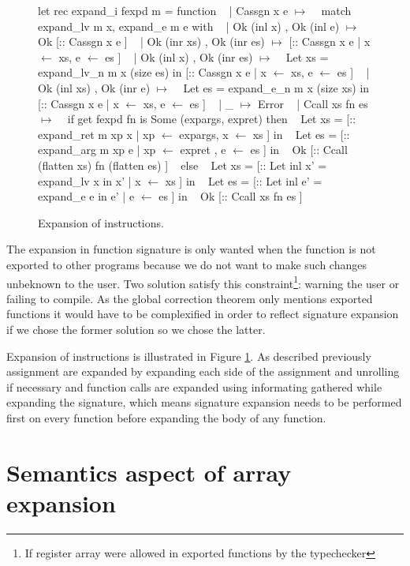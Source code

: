 \documentclass{article}
\begin{document}
\begin{figure}[t]
\obeylines\obeyspaces\ttfamily%
let rec expand\_i fexpd m = function
~ | Cassgn x e \(\mapsto\)
~   match expand\_lv m x, expand\_e m e    with
~   | Ok (inl x)       , Ok (inl e)      \(\mapsto\) Ok [:: Cassgn x e ]
~   | Ok (inr xs)      , Ok (inr es)     \(\mapsto\) [:: Cassgn x e | x \(\gets\) xs, e \(\gets\) es ]
~   | Ok (inl x)       , Ok (inr es)     \(\mapsto\)
~     Let xs = expand\_lv\_n m x (size es) in [:: Cassgn x e | x \(\gets\) xs, e \(\gets\) es ]
~   | Ok (inl xs)      , Ok (inr e)      \(\mapsto\)
~     Let es = expand\_e\_n  m x (size xs) in [:: Cassgn x e | x \(\gets\) xs, e \(\gets\) es ]
~   | \_                                  \(\mapsto\) Error
~ | Ccall xs fn es \(\mapsto\)
~   if get fexpd fn is Some (expargs, expret) then
~     Let xs = [:: expand\_ret m xp x | xp \(\gets\) expargs, x \(\gets\) xs ] in
~     Let es = [:: expand\_arg m xp e | xp \(\gets\) expret , e \(\gets\) es ] in
~     Ok [:: Ccall (flatten xs) fn (flatten es) ]
~   else
~     Let xs = [:: Let inl x' = expand\_lv x in x' | x \(\gets\) xs ] in
~     Let es = [:: Let inl e' = expand\_e e  in e' | e \(\gets\) es ] in
~     Ok [:: Ccall xs fn es ]
\normalfont%
\caption{Expansion of instructions.}\label{fig:insexp}
\end{figure}

\smallskip

The expansion in function signature is only wanted when the function is not
exported to other programs because we do not want to make such changes unbeknown
to the user. Two solution satisfy this constraint\footnote{If register array
were allowed in exported functions by the typechecker}: warning the user or
failing to compile. As the global correction theorem only mentions exported
functions it would have to be complexified in order to reflect signature
expansion if we chose the former solution so we chose the latter.

\medskip

Expansion of instructions is illustrated in Figure \ref{fig:insexp}. As
described previously assignment are expanded by expanding each side of the
assignment and unrolling if necessary and function calls are expanded using
informating gathered while expanding the signature, which means signature
expansion needs to be performed first on every function before expanding the
body of any function.

\section{Semantics aspect of array expansion}\label{sec:semantics}
\end{document}
